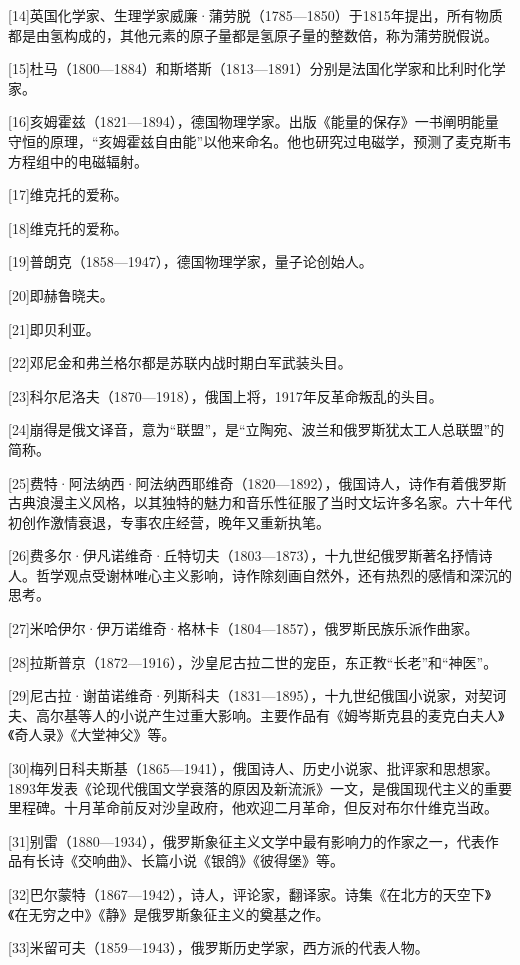[14]英国化学家、生理学家威廉·蒲劳脱（1785—1850）于1815年提出，所有物质都是由氢构成的，其他元素的原子量都是氢原子量的整数倍，称为蒲劳脱假说。

[15]杜马（1800—1884）和斯塔斯（1813—1891）分别是法国化学家和比利时化学家。

[16]亥姆霍兹（1821—1894），德国物理学家。出版《能量的保存》一书阐明能量守恒的原理，“亥姆霍兹自由能”以他来命名。他也研究过电磁学，预测了麦克斯韦方程组中的电磁辐射。

[17]维克托的爱称。

[18]维克托的爱称。

[19]普朗克（1858—1947），德国物理学家，量子论创始人。

[20]即赫鲁晓夫。

[21]即贝利亚。

[22]邓尼金和弗兰格尔都是苏联内战时期白军武装头目。

[23]科尔尼洛夫（1870—1918），俄国上将，1917年反革命叛乱的头目。

[24]崩得是俄文译音，意为“联盟”，是“立陶宛、波兰和俄罗斯犹太工人总联盟”的简称。

[25]费特·阿法纳西·阿法纳西耶维奇（1820—1892），俄国诗人，诗作有着俄罗斯古典浪漫主义风格，以其独特的魅力和音乐性征服了当时文坛许多名家。六十年代初创作激情衰退，专事农庄经营，晚年又重新执笔。

[26]费多尔·伊凡诺维奇·丘特切夫（1803—1873），十九世纪俄罗斯著名抒情诗人。哲学观点受谢林唯心主义影响，诗作除刻画自然外，还有热烈的感情和深沉的思考。

[27]米哈伊尔·伊万诺维奇·格林卡（1804—1857），俄罗斯民族乐派作曲家。

[28]拉斯普京（1872—1916），沙皇尼古拉二世的宠臣，东正教“长老”和“神医”。

[29]尼古拉·谢苗诺维奇·列斯科夫（1831—1895），十九世纪俄国小说家，对契诃夫、高尔基等人的小说产生过重大影响。主要作品有《姆岑斯克县的麦克白夫人》《奇人录》《大堂神父》等。

[30]梅列日科夫斯基（1865—1941），俄国诗人、历史小说家、批评家和思想家。1893年发表《论现代俄国文学衰落的原因及新流派》一文，是俄国现代主义的重要里程碑。十月革命前反对沙皇政府，他欢迎二月革命，但反对布尔什维克当政。

[31]别雷（1880—1934），俄罗斯象征主义文学中最有影响力的作家之一，代表作品有长诗《交响曲》、长篇小说《银鸽》《彼得堡》等。

[32]巴尔蒙特（1867—1942），诗人，评论家，翻译家。诗集《在北方的天空下》《在无穷之中》《静》是俄罗斯象征主义的奠基之作。

[33]米留可夫（1859—1943），俄罗斯历史学家，西方派的代表人物。

